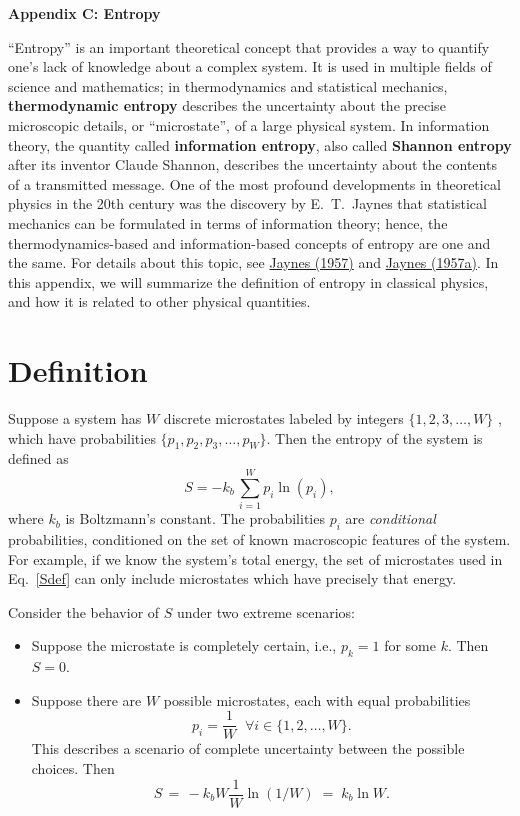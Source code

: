 \documentclass[pra,12pt]{revtex4}
\begin{document}
\begin{center}
{\large \textbf{Appendix C: Entropy}}
\end{center}

``Entropy'' is an important theoretical concept that provides a way to
quantify one's lack of knowledge about a complex system.  It is used
in multiple fields of science and mathematics; in thermodynamics and
statistical mechanics, \textbf{thermodynamic entropy} describes the
uncertainty about the precise microscopic details, or ``microstate'',
of a large physical system.  In information theory, the quantity
called \textbf{information entropy}, also called \textbf{Shannon
  entropy} after its inventor Claude Shannon, describes the
uncertainty about the contents of a transmitted message.  One of the
most profound developments in theoretical physics in the 20th century
was the discovery by E.~T.~Jaynes that statistical mechanics can be
formulated in terms of information theory; hence, the
thermodynamics-based and information-based concepts of entropy are one
and the same.  For details about this topic, see
\hyperref[cite:jaynes]{Jaynes (1957)} and
\hyperref[cite:jaynes2]{Jaynes (1957a)}.  In this appendix, we will
summarize the definition of entropy in classical physics, and how it
is related to other physical quantities.

\section{Definition}
\label{sec:entrodef}

Suppose a system has $W$ discrete microstates labeled by integers
$\{1,2,3,\dots, W\}$ , which have probabilities $\{p_1, p_2, p_3,
\dots, p_W\}$.  Then the entropy of the system is defined as
\begin{equation}
  S = - k_b \, \sum_{i=1}^W p_i \ln(p_i),
  \label{Sdef}
\end{equation}
where $k_b$ is Boltzmann's constant.  The probabilities $p_i$ are
\textit{conditional} probabilities, conditioned on the set of known
macroscopic features of the system.  For example, if we know the
system's total energy, the set of microstates used in Eq.~\eqref{Sdef}
can only include microstates which have precisely that energy.

Consider the behavior of $S$ under two extreme scenarios:

\begin{itemize}
\item Suppose the microstate is completely certain, i.e., $p_k = 1$
  for some $k$.  Then $S = 0$.

\item Suppose there are $W$ possible microstates, each with equal
  probabilities
  \begin{equation}
    p_i = \frac{1}{W} \;\;\forall i \in \{1,2,\dots,W\}.
  \end{equation}
  This describes a scenario of complete uncertainty between the
  possible choices.  Then
  \begin{equation}
    S \,=\, -k_b W \frac{1}{W} \ln(1/W) \;=\; k_b \ln W.
  \end{equation}
\end{itemize}
\end{document}
